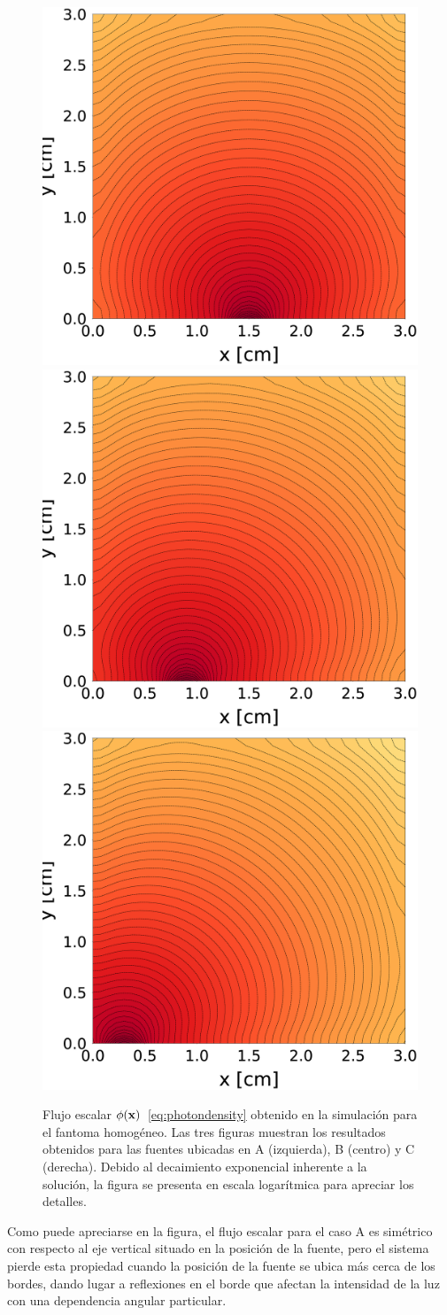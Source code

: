 \begin{figure}[h!]
\centering
  \includegraphics[width=0.32\linewidth]{figuras/ph1A.eps}
  \includegraphics[width=0.32\linewidth]{figuras/ph1B.eps}
  \includegraphics[width=0.32\linewidth]{figuras/ph1C.eps}
  \caption{
  Flujo escalar $\phi(\mathbf{x})$~\eqref{eq:photondensity} 
  obtenido en la simulación para el fantoma homogéneo. 
  Las tres figuras muestran los resultados obtenidos 
  para las fuentes ubicadas en A (izquierda), B (centro) y C (derecha). 
  Debido al decaimiento exponencial inherente a la solución, la figura se presenta en escala logarítmica para apreciar los detalles.}
\label{fig:ph1timef}
\end{figure}
Como puede apreciarse en la figura, el flujo escalar para el caso A 
es simétrico con respecto al eje vertical situado en la posición 
de la fuente, pero el sistema pierde esta propiedad cuando la 
posición de la fuente se ubica más cerca de los bordes, 
dando lugar a reflexiones en el borde que afectan la intensidad 
de la luz con una dependencia angular particular.

